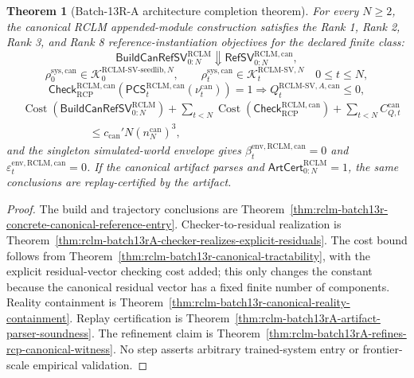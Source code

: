 \documentclass[11pt,a4paper]{article}
\newtheorem{theorem}{Theorem}[section]
\newcommand{\Kcal}{\mathcal K}
\newcommand{\RCP}{\mathrm{RCP}}
\newcommand{\RCLM}{\mathrm{RCLM}}
\newcommand{\sys}{\mathrm{sys}}
\newcommand{\Cost}{\operatorname{Cost}}
\begin{document}
\begin{theorem}[Batch-13R-A architecture completion theorem]
\label{thm:rclm-batch13rA-architecture-completion}
For every \(N\ge2\), the canonical RCLM appended-module construction satisfies the Rank 1, Rank 2, Rank 3, and Rank 8 reference-instantiation objectives for the declared finite class:
\[
\mathsf{BuildCanRefSV}_{0:N}^{\RCLM}
\Downarrow
\mathsf{RefSV}_{0:N}^{\RCLM,\mathrm{can}},
\]
\[
\rho_0^{\sys,\mathrm{can}}
\in
\Kcal_0^{\RCLM\text{-}\mathrm{SV\mbox{-}seedlib},N},
\qquad
\rho_t^{\sys,\mathrm{can}}
\in
\Kcal_t^{\RCLM\text{-}\mathrm{SV},N}
\quad 0\le t\le N,
\]
\[
\mathsf{Check}_{\RCP}^{\RCLM,\mathrm{can}}(\mathsf{PCS}_t^{\RCLM,\mathrm{can}}(\nu_t^{\mathrm{can}}))=1
\Longrightarrow
Q_t^{\RCLM\text{-}\mathrm{SV},A,\mathrm{can}}\le0,
\]
\[
\begin{aligned}
&\Cost(\mathsf{BuildCanRefSV}_{0:N}^{\RCLM})
+\sum_{t<N}\Cost(\mathsf{Check}_{\RCP}^{\RCLM,\mathrm{can}})
+\sum_{t<N}C_{Q,t}^{\mathrm{can}}\\
&\hspace{6em}\le
c_{\mathrm{can}}'N(n_N^{\mathrm{can}})^3,
\end{aligned}
\]
and the singleton simulated-world envelope gives \(\beta_t^{\mathrm{env},\RCLM,\mathrm{can}}=0\) and \(\varepsilon_t^{\mathrm{env},\RCLM,\mathrm{can}}=0\).  If the canonical artifact parses and \(\mathsf{ArtCert}_{0:N}^{\RCLM}=1\), the same conclusions are replay-certified by the artifact.
\end{theorem}

\begin{proof}
The build and trajectory conclusions are Theorem~\ref{thm:rclm-batch13r-concrete-canonical-reference-entry}.  Checker-to-residual realization is Theorem~\ref{thm:rclm-batch13rA-checker-realizes-explicit-residuals}.  The cost bound follows from Theorem~\ref{thm:rclm-batch13r-canonical-tractability}, with the explicit residual-vector checking cost added; this only changes the constant because the canonical residual vector has a fixed finite number of components.  Reality containment is Theorem~\ref{thm:rclm-batch13r-canonical-reality-containment}.  Replay certification is Theorem~\ref{thm:rclm-batch13rA-artifact-parser-soundness}.  The refinement claim is Theorem~\ref{thm:rclm-batch13rA-refines-rcp-canonical-witness}.  No step asserts arbitrary trained-system entry or frontier-scale empirical validation.
\end{proof}
\end{document}

